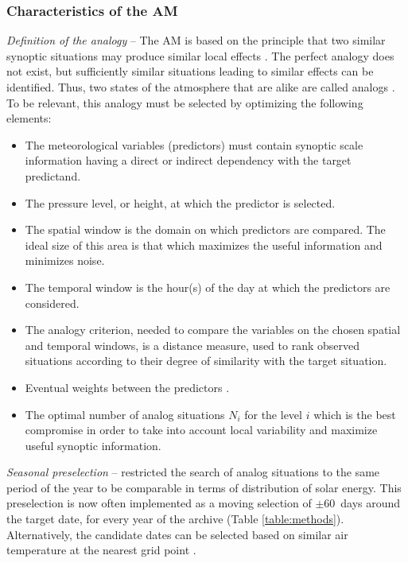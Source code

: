 \documentclass[review]{elsarticle}
\begin{document}
\subsubsection{Characteristics of the AM}

\textit{Definition of the analogy} -- The AM is based on the principle that two similar synoptic situations may produce similar local effects \citep{Lorenz1956}. The perfect analogy does not exist, but sufficiently similar situations leading to similar effects can be identified. Thus, two states of the atmosphere that are alike are called analogs \citep{Lorenz1969}. To be relevant, this analogy must be selected by optimizing the following elements:

\begin{itemize}		
	\item The meteorological variables (predictors) must contain synoptic scale information having a direct or indirect dependency with the target predictand.
	\item The pressure level, or height, at which the predictor is selected.
	\item The spatial window is the domain on which predictors are compared. The ideal size of this area is that which maximizes the useful information and minimizes noise.
	\item The temporal window is the hour(s) of the day at which the predictors are considered.
	\item The analogy criterion, needed to compare the variables on the chosen spatial and temporal windows, is a distance measure, used to rank observed situations according to their degree of similarity with the target situation.
	\item Eventual weights between the predictors \cite[e.g.,][]{Horton2017b, Junk2015}.
	\item The optimal number of analog situations $N_{i}$ for the level $i$ which is the best compromise in order to take into account local variability and maximize useful synoptic information.
\end{itemize}

\textit{Seasonal preselection} -- \citet{Lorenz1969} restricted the search of analog situations to the same period of the year to be comparable in terms of distribution of solar energy. This preselection is now often implemented as a moving selection of $\pm$60~days around the target date, for every year of the archive (Table \ref{table:methods}). Alternatively, the candidate dates can be selected based on similar air temperature at the nearest grid point \citep[Table \ref{table:methods}][]{BenDaoud2016}.
\end{document}
